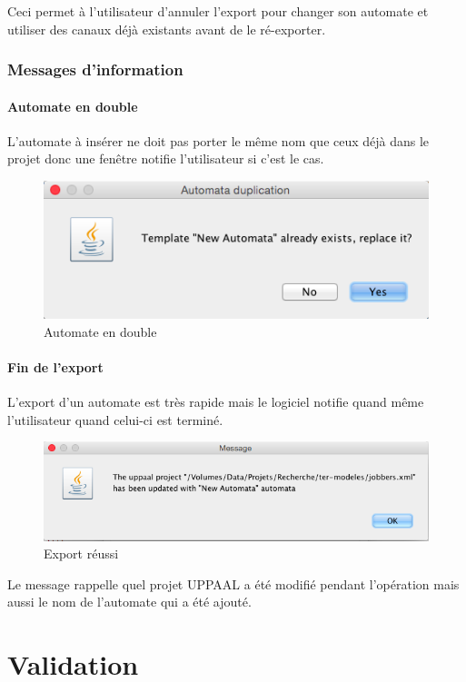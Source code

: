 \documentclass[12pt,a4paper]{report}
\begin{document}
Ceci permet à l'utilisateur d'annuler l'export pour changer son automate et utiliser 
des canaux déjà existants avant de le ré-exporter.

\subsection{Messages d'information}
\subsubsection*{Automate en double}
L'automate à insérer ne doit pas porter le même nom que ceux déjà dans le projet donc
une fenêtre notifie l'utilisateur si c'est le cas.

\begin{figure}[h]
  \centering
  \includegraphics[scale=0.6]{ressources/gui/exists.png}
  \caption{Automate en double}
\end{figure}

\subsubsection*{Fin de l'export}
L'export d'un automate est très rapide mais le logiciel notifie quand même 
l'utilisateur quand celui-ci est terminé. 

\begin{figure}[h]
  \centering
  \includegraphics[scale=0.6]{ressources/gui/success.png}
  \caption{Export réussi}
\end{figure}

Le message rappelle quel projet UPPAAL a été modifié pendant l'opération mais 
aussi le nom de l'automate qui a été ajouté.

\chapter{Validation}
\end{document}
